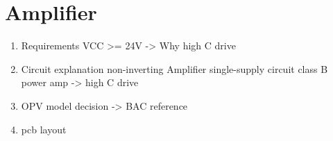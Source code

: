\section{Amplifier}

\begin{enumerate}
  \item Requirements
  \subitem VCC >= 24V -> Why
  \subitem high C drive
  \item Circuit explanation
  \subitem non-inverting Amplifier
  \subitem single-supply circuit
  \subitem class B power amp -> high C drive
  \item OPV model decision -> BAC reference
  \item pcb layout
\end{enumerate}